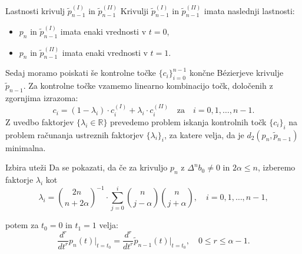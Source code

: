 \documentclass{beamer}
\begin{document}
\begin{frame}{Lastnosti krivulj \(\tilde{p}_{n-1}^{(I)}\) in \(\tilde{p}_{n-1}^{(II)}\)}
    Krivulji \(\tilde{p}_{n-1}^{(I)}\) in \(\tilde{p}_{n-1}^{(II)}\) imata naslednji lastnosti:
    \begin{itemize}
        \item \(p_n\) in \(\tilde{p}_{n-1}^{(I)}\) imata enaki vrednosti v \(t = 0\),
        \item \(p_n\) in \(\tilde{p}_{n-1}^{(II)}\) imata enaki vrednosti v \(t = 1\).
    \end{itemize}
\end{frame}


\begin{frame}
  Sedaj moramo poiskati še kontrolne točke $\{c_i\}_{i=0}^{n-1}$ končne Bézierjeve krivulje $\tilde{p}_{n-1}$.
  Za kontrolne točke vzamemo linearno kombinacijo točk, določenih z zgornjima izrazoma:
  \[ c_i = (1 - \lambda_i) \cdot c_i^{(I)} + \lambda_i \cdot c_i^{(II)} \quad \text{za} \quad i = 0, 1, \ldots, n - 1. \]
  Z uvedbo faktorjev $\{\lambda_i \in \mathbb{R}\}$ prevedemo problem iskanja kontrolnih točk $\{c_i\}_i$ na problem računanja ustreznih faktorjev $\{\lambda_i\}_i$, za katere velja, da je $d_2(p_n, \tilde{p}_{n-1})$ minimalna.
\end{frame}

\begin{frame}{Izbira uteži}
   Da se pokazati, da če za krivuljo $p_n$ z $\Delta^n b_0 \neq 0$ in $2\alpha \leq n$, izberemo faktorje $\lambda_i$ kot
\[
\lambda_i = \binom{2n}{n + 2\alpha}^{-1} \cdot \sum_{j=0}^i \binom{n}{j - \alpha} \binom{n}{j + \alpha}, \quad i = 0, 1, \ldots, n - 1,
\]

    potem za $t_0 = 0$ in $t_1 = 1$ velja:
    \[
    \frac{d^r}{dt^r} p_n(t) \bigg|_{t=t_0} = \frac{d^r}{dt^r} \tilde{p}_{n-1}(t) \bigg|_{t=t_0}, \quad 0 \leq r \leq \alpha - 1.
    \]
\end{frame}
\end{document}
